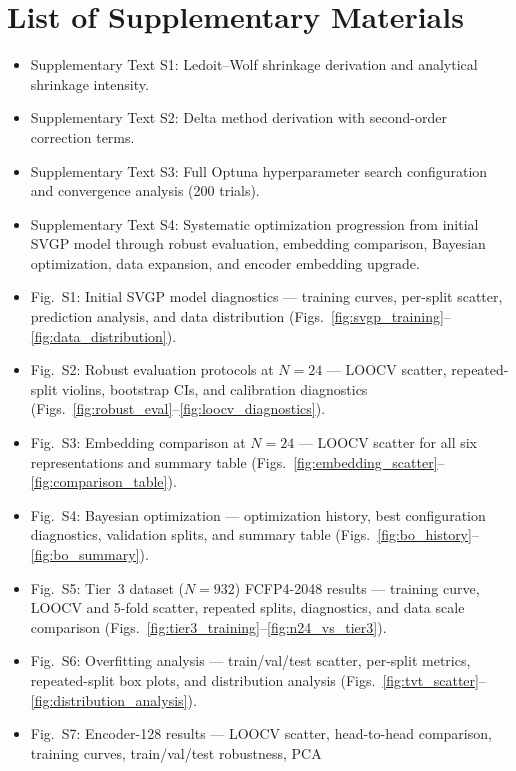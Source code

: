 \documentclass{article}
\begin{document}
\section*{List of Supplementary Materials}

\begin{itemize}[leftmargin=2em,itemsep=2pt]
\item Supplementary Text S1: Ledoit--Wolf shrinkage derivation and
  analytical shrinkage intensity.
\item Supplementary Text S2: Delta method derivation with
  second-order correction terms.
\item Supplementary Text S3: Full Optuna hyperparameter search
  configuration and convergence analysis (200 trials).
\item Supplementary Text S4: Systematic optimization progression from
  initial SVGP model through robust evaluation, embedding comparison,
  Bayesian optimization, data expansion, and encoder embedding upgrade.
\item Fig.~S1: Initial SVGP model diagnostics --- training curves,
  per-split scatter, prediction analysis, and data distribution
  (Figs.~\ref{fig:svgp_training}--\ref{fig:data_distribution}).
\item Fig.~S2: Robust evaluation protocols at $N = 24$ --- LOOCV scatter,
  repeated-split violins, bootstrap CIs, and calibration diagnostics
  (Figs.~\ref{fig:robust_eval}--\ref{fig:loocv_diagnostics}).
\item Fig.~S3: Embedding comparison at $N = 24$ --- LOOCV scatter for all
  six representations and summary table
  (Figs.~\ref{fig:embedding_scatter}--\ref{fig:comparison_table}).
\item Fig.~S4: Bayesian optimization --- optimization history, best
  configuration diagnostics, validation splits, and summary table
  (Figs.~\ref{fig:bo_history}--\ref{fig:bo_summary}).
\item Fig.~S5: Tier~3 dataset ($N = 932$) FCFP4-2048 results ---
  training curve, LOOCV and 5-fold scatter, repeated splits,
  diagnostics, and data scale comparison
  (Figs.~\ref{fig:tier3_training}--\ref{fig:n24_vs_tier3}).
\item Fig.~S6: Overfitting analysis --- train/val/test scatter,
  per-split metrics, repeated-split box plots, and distribution analysis
  (Figs.~\ref{fig:tvt_scatter}--\ref{fig:distribution_analysis}).
\item Fig.~S7: Encoder-128 results --- LOOCV scatter, head-to-head
  comparison, training curves, train/val/test robustness, PCA

\end{itemize}
\end{document}
